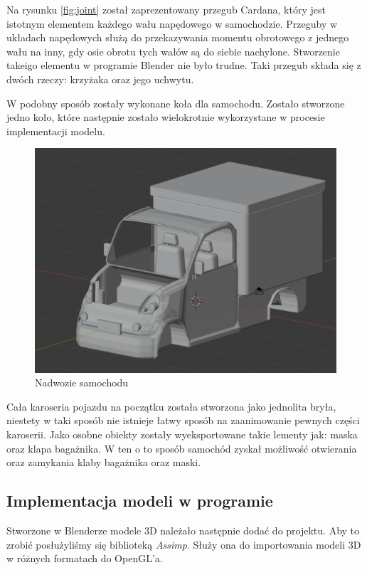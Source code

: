 \documentclass[a4paper,12pt]{article}
\numberwithin{equation}{section}
\begin{document}
 Na rysunku \ref{fig:joint} został zaprezentowany przegub Cardana, który jest istotnym elementem każdego wału napędowego w samochodzie. Przeguby w układach napędowych służą do przekazywania momentu obrotowego z jednego wału na inny, gdy osie obrotu tych wałów są do siebie nachylone. Stworzenie takeigo elementu w programie Blender nie było trudne. Taki przegub składa się z dwóch rzeczy: krzyżaka oraz jego uchwytu.
 
 W podobny sposób zostały wykonane koła dla samochodu. Zostało stworzone jedno koło, które następnie zostało wielokrotnie wykorzystane w procesie implementacji modelu. 

 \begin{figure}[h!]
    \centering
    \includegraphics[width=\textwidth]{nadwozie.png}
    \caption{Nadwozie samochodu}
    \label{fig:nadwozie}
\end{figure}

Cała karoseria pojazdu na początku została stworzona jako jednolita bryła, niestety w taki sposób nie istnieje łatwy sposób na zaanimowanie pewnych części karoserii. Jako osobne obiekty zostały wyeksportowane takie lementy jak: maska oraz klapa bagażnika. W ten o to sposób samochód zyskał możliwość otwierania oraz zamykania klaby bagażnika oraz maski. 


\subsection{Implementacja modeli w programie}
Stworzone w Blenderze modele 3D należało następnie dodać do projektu. Aby to zrobić posłużyliśmy się biblioteką \textit{Assimp}. Służy ona do importowania modeli 3D w różnych formatach do OpenGL'a.
\end{document}
